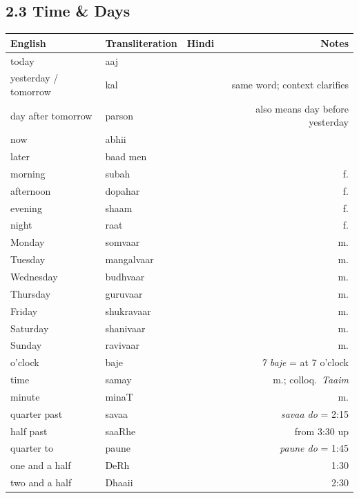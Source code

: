 \subsection{2.3 Time \& Days}

\begin{tabular}{@{}VTDN@{}}
  \toprule
  English & Transliteration & Hindi & Notes \\
  \midrule
  today      & aaj        &        & \\
  yesterday / tomorrow & kal &  & same word; context clarifies \\
  day after tomorrow & parson &  & also means day before yesterday \\
  now        & abhii       &       & \\
  later      & baad men   &   & \\
  morning    & subah      &      & f. \\
  afternoon  & dopahar    &     & f. \\
  evening    & shaam      &       & f. \\
  night      & raat       &       & f. \\
  Monday     & somvaar    &    & m. \\
  Tuesday    & mangalvaar &   & m. \\
  Wednesday  & budhvaar   &    & m. \\
  Thursday   & guruvaar   &   & m. \\
  Friday     & shukravaar &  & m. \\
  Saturday   & shanivaar  &    & m. \\
  Sunday     & ravivaar   &    & m. \\
  o'clock    & baje       &       & \textit{7 baje} = at 7 o'clock \\
  time       & samay      &       & m.; colloq.\ \textit{Taaim} \\
  minute     & minaT      &      & m. \\
  quarter past & savaa    &       & \textit{savaa do} = 2:15 \\
  half past  & saaRhe     &      & from 3:30 up \\
  quarter to & paune      &      & \textit{paune do} = 1:45 \\
  one and a half & DeRh   &       & 1:30 \\
  two and a half & Dhaaii &       & 2:30 \\
  \bottomrule
\end{tabular}

